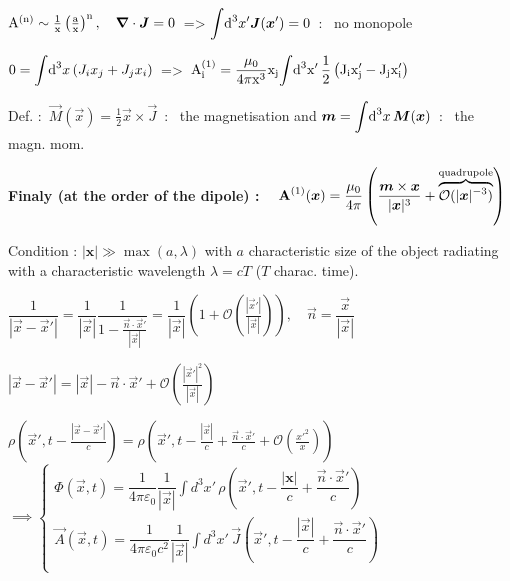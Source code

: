 \item $\rm{A}^{(n)} \sim \frac{1}{x} \left( \frac{a}{x} \right)^n, \quad \vec{\nabla}\cdot\vec{J} = 0 \, $ => $ \displaystyle{\int} \ud ^3x' \vec{J}(\vec{x}') = 0 \,$ : \, no monopole

\item $0 = \displaystyle{\int} \ud ^3x \, (J_i x_j + J_j x_i) \,$ => $\, \rm{A}^{(1)}_i = \dfrac{\mu_0}{4\pi x^3} x_j \displaystyle{\int} \ud ^3x' \, \frac{1}{2}\left(J_ix'_j - J_j x'_i \right)$

\item  Def. : $\, \vec{M}(\vec{x}) = \frac{1}{2} \vec{x}\times\vec{J} \,$ : \, the magnetisation and  $\vec{m} = \displaystyle{\int} \ud ^3x \, \vec{M}(\vec{x}) \, $ : \, the magn. mom.

\item \textbf{Finaly (at the order of the dipole) :} $\quad  \vec{\rm{A}}^{(1)}(\vec{x}) =  \dfrac{\mu_0}{4\pi}\left(\dfrac{\vec{m}\times\vec{x}}{|\vec{x}|^3} + \overbrace{\mathcal{O}(|\vec{x}|^{-3})}^\text{quadrupole}\right)$\\ 
\squishend
{}

Condition : $|\textbf{x}| \gg \max(a, \lambda)$ with $a$ characteristic size of the object radiating with a characteristic wavelength $\lambda = cT$ ($T$ charac. time).
\squishlist
\item $\dfrac{1}{|\vec{x}-\vec{x}'|} = \dfrac{1}{|\vec{x}|}\dfrac{1}{1- \frac{\vec{n} \cdot \vec{x}'}{|\vec{x}|}} = \dfrac{1}{|\vec{x}|}\left(1+\mathcal{O}(\frac{|\vec{x}'|}{|\vec{x}|})\right), \quad \vec{n} = \dfrac{\vec{x}}{|\vec{x}|}$

\item $|\vec{x}-\vec{x}'| = |\vec{x}| - \vec{n} \cdot \vec{x}' + \mathcal{O}(\frac{|\vec{x}'|^2}{|\vec{x}|})$

\item $\rho(\vec{x}', t - \frac{|\vec{x} - \vec{x}'|}{c}) = \rho (\vec{x}', t-\frac{|\vec{x}|}{c} + \frac{\vec{n}\cdot\vec{x}'}{c} + \mathcal{O}(\frac{x'^2}{x}))$
\\
$      \implies
\begin{cases}
\Phi(\vec{x},t) = \dfrac{1}{4\pi\varepsilon_0}\dfrac{1}{|\vec{x}|}\displaystyle{\int} d^3x' \, \rho(\vec{x}',t- \dfrac{|\textbf{x}|}{c} + \dfrac{\vec{n} \cdot \vec{x}'}{c}) \\
\vec{A}(\vec{x},t) = \dfrac{1}{4\pi\varepsilon_0c^2} \dfrac{1}{|\vec{x}|} \displaystyle{\int} d^3x' \, \vec{J}(\vec{x}',t- \dfrac{|\vec{x}|}{c} + \dfrac{\vec{n} \cdot \vec{x}'}{c}) \\
\end{cases}$

